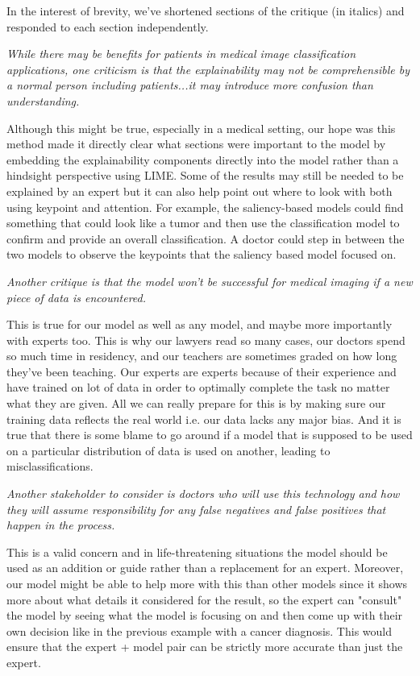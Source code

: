 In the interest of brevity, we've shortened sections of the critique (in italics) and responded to each section independently.

\emph{While there may be benefits for patients in medical image classification applications, one criticism is that the explainability may not be comprehensible by a normal person including patients...it may introduce more confusion than understanding.}

Although this might be true, especially in a medical setting, our hope was this method made it directly clear what sections were important to the model by embedding the explainability components directly into the model rather than a hindsight perspective using LIME. Some of the results may still be needed to be explained by an expert but it can also help point out where to look with both using keypoint and attention. For example, the saliency-based models could find something that could look like a tumor and then use the classification model to confirm and provide an overall classification. A doctor could step in between the two models to observe the keypoints that the saliency based model focused on.

\emph{Another critique is that the model won’t be successful for medical imaging if a new piece of data is encountered.}

This is true for our model as well as any model, and maybe more importantly with experts too. This is why our lawyers read so many cases, our doctors spend so much time in residency, and our teachers are sometimes graded on how long they've been teaching. Our experts are experts because of their experience and have trained on lot of data in order to optimally complete the task no matter what they are given. All we can really prepare for this is by making sure our training data reflects the real world i.e. our data lacks any major bias. And it is true that there is some blame to go around if a model that is supposed to be used on a particular distribution of data is used on another, leading to misclassifications.

\emph{Another stakeholder to consider is doctors who will use this technology and how they will assume responsibility for any false negatives and false positives that happen in the process.}

This is a valid concern and in life-threatening situations the model should be used as an addition or guide rather than a replacement for an expert. Moreover, our model might be able to help more with this than other models since it shows more about what details it considered for the result, so the expert can "consult" the model by seeing what the model is focusing on and then come up with their own decision like in the previous example with a cancer diagnosis. This would ensure that the expert + model pair can be strictly more accurate than just the expert.

